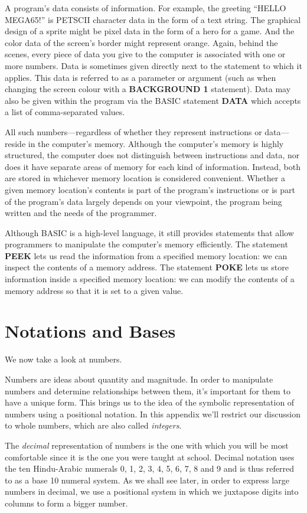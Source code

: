A program’s data consists of information. For example, the greeting ``HELLO MEGA65!'' is PETSCII character data in the form of a text string. The graphical design of a sprite might be pixel data in the form of a hero for a game. And the color data of the screen’s border might represent orange. Again, behind the scenes, every piece of data you give to the computer is associated with one or more numbers. Data is sometimes given directly next to the statement to which it applies. This data is referred to as a parameter or argument (such as when changing the screen colour with a {\bf BACKGROUND 1} statement). Data may also be given within the program via the BASIC statement {\bf DATA} which accepts a list of comma-separated values.

All such numbers---regardless of whether they represent instructions or data---reside in the computer’s memory. Although the computer’s memory is highly structured, the computer does not distinguish between instructions and data, nor does it have separate areas of memory for each kind of information. Instead, both are stored in whichever memory location is considered convenient. Whether a given memory location’s contents is part of the program’s instructions or is part of the program’s data largely depends on your viewpoint, the program being written and the needs of the programmer.

Although BASIC is a high-level language, it still provides statements that allow programmers to manipulate the computer’s memory efficiently. The statement {\bf PEEK} lets us read the information from a specified memory location: we can inspect the contents of a memory address. The statement {\bf POKE} lets us store information inside a specified memory location: we can modify the contents of a memory address so that it is set to a given value.

\section{Notations and Bases}
We now take a look at numbers.

Numbers are ideas about quantity and magnitude. In order to manipulate numbers and determine relationships between them, it’s important for them to have a unique form. This brings us to the idea of the symbolic representation of numbers using a positional notation. In this appendix we’ll restrict our discussion to whole numbers, which are also called {\it integers}.

The {\it decimal} representation of numbers is the one with which you will be most comfortable since it is the one you were taught at school. Decimal notation uses the ten Hindu-Arabic numerals 0, 1, 2, 3, 4, 5, 6, 7, 8 and 9 and is thus referred to as a base 10 numeral system. As we shall see later, in order to express large numbers in decimal, we use a positional system in which we juxtapose digits into columns to form a bigger number.

